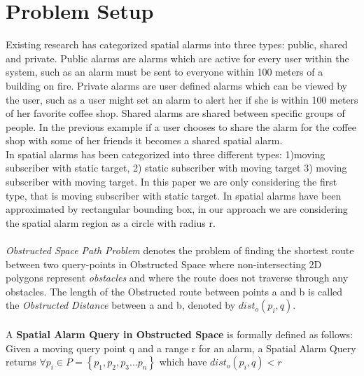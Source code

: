 \documentclass{sig-alternate}
\begin{document}
\section{Problem Setup}
Existing research has categorized spatial alarms into three types: public, shared and private. Public alarms are alarms which are active for every user within the system, such as an alarm must be sent to everyone within 100 meters of a building on fire. Private alarms are user defined alarms which can be viewed by the user, such as a user might set an alarm to alert her if she is within 100 meters of her favorite coffee shop. Shared alarms are shared between specific groups of people. In the previous example if a user chooses to share the alarm for the coffee shop with some of her friends it becomes a shared spatial alarm.\\
In \cite{bamba} spatial alarms has been categorized into three different types: 1)moving subscriber with static target, 2) static subscriber with moving target 3) moving subscriber with moving target. In this paper we are only considering the first type, that is moving subscriber with static target. 
In \cite{mur} spatial alarms have been approximated by rectangular bounding box, in our approach we are considering the spatial alarm region as a circle with radius r.\\ \\
\textit{Obstructed Space Path Problem} \cite{ognn} denotes the problem of finding the shortest route between two query-points  in Obstructed Space where non-intersecting 2D polygons represent \textit{obstacles} and where the route does not traverse through any obstacles. The length of the Obstructed route between points a and b is called the \textit{Obstructed Distance} between a and b, denoted by $dist_o(p_i,q)$.\\ \\
A \textbf{Spatial Alarm Query in Obstructed Space} is formally defined as follows:
Given a moving query point q and a range r for an alarm, a Spatial Alarm Query returns $\forall p_i \in P=\left\lbrace p_1,p_2,p_3...p_n\right\rbrace  $ which have $dist_o(p_i,q)<r $
\end{document}
